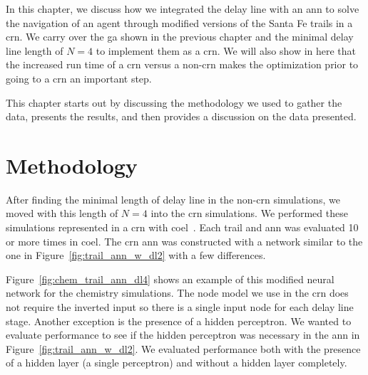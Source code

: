 In this chapter, we discuss how we integrated the delay line with an \gls{ann} to solve the navigation of an agent through modified versions of the Santa Fe trails in a \gls{crn}. We carry over the \gls{ga} shown in the previous chapter and the minimal delay line length of $N=4$ to implement them as a \gls{crn}. We will also show in here that the increased run time of a \gls{crn} versus a non-\gls{crn} makes the optimization prior to going to a \gls{crn} an important step. 

This chapter starts out by discussing the methodology we used to gather the data, presents the results, and then provides a discussion on the data presented.

\section{Methodology}
After finding the minimal length of delay line in the non-\gls{crn} simulations, we moved with this length of $N=4$ into the \gls{crn} simulations. We performed these simulations represented in a \gls{crn} with \gls{coel}~\cite{Banda2014-qw}. Each trail and \gls{ann} was evaluated 10 or more times in \gls{coel}. The \gls{crn} \gls{ann} was constructed with a network similar to the one in Figure~\ref{fig:trail_ann_w_dl2} with a few differences. 

Figure~\ref{fig:chem_trail_ann_dl4} shows an example of this modified neural network for the chemistry simulations. The node model we use in the \gls{crn} does not require the inverted input so there is a single input node for each delay line stage. Another exception is the presence of a hidden perceptron. We wanted to evaluate performance to see if the hidden perceptron was necessary in the \gls{ann} in Figure~\ref{fig:trail_ann_w_dl2}. We evaluated performance both with the presence of a hidden layer (a single perceptron) and without a hidden layer completely.

